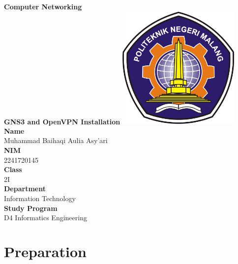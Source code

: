 \documentclass[12pt,titlepage]{article}
\newcommand{\vSubject}{Computer Networking}
\newcommand{\vSubtitle}{GNS3 and OpenVPN Installation}
\newcommand{\vName}{Muhammad Baihaqi Aulia Asy'ari}
\newcommand{\vNIM}{2241720145}
\newcommand{\vClass}{2I}
\newcommand{\vDepartment}{Information Technology}
\newcommand{\vStudyProgram}{D4 Informatics Engineering}
\begin{document}
\begin{titlepage}
    \centering
    \vfill
    {\bfseries\LARGE
        \vSubject\\
        \vskip0.25cm
        \vSubtitle
    }
    \vfill
    \includegraphics[width=6cm]{images/polinema-logo.png}
    \vfill
    {
        \textbf{Name}\\
        \vName\\
        \vskip0.5cm
        \textbf{NIM}\\
        \vNIM\\
        \vskip0.5cm
        \textbf{Class}\\
        \vClass\\
        \vskip0.5cm
        \textbf{Department}\\
        \vDepartment\\
        \vskip0.5cm
        \textbf{Study Program}\\
        \vStudyProgram
    }
\end{titlepage}

\newpage

\section{Preparation}
\end{document}
